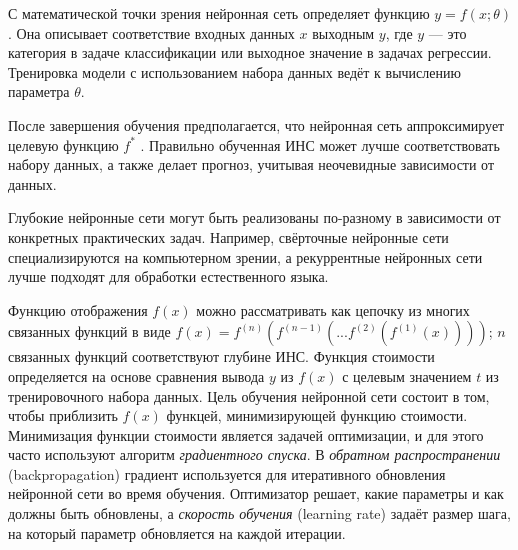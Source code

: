 С математической точки зрения нейронная сеть определяет функцию ${y = f(x; \theta)}$. Она описывает соответствие входных данных ${x}$ выходным ${y}$, где ${y}$ --- это категория в задаче классификации или выходное значение в задачах регрессии. Тренировка модели с использованием набора данных ведёт к вычислению параметра {$\theta$}.

После завершения обучения предполагается, что нейронная сеть аппроксимирует целевую функцию ${f^*}$ \cite{Goodfellow-et-al-2016}. Правильно обученная ИНС может лучше соответствовать набору данных, а также делает прогноз, учитывая неочевидные зависимости от данных.

Глубокие нейронные сети могут быть реализованы по-разному в зависимости от конкретных практических задач. Например, свёрточные нейронные сети специализируются на компьютерном зрении, а рекуррентные нейронных сети лучше подходят для обработки естественного языка.

Функцию отображения ${f(x)}$ можно рассматривать как цепочку из многих связанных функций в виде  ${f(x) = f^{(n)}(f^{(n-1)}(...f^{(2)}(f^{(1)}(x))))}$; ${n}$ связанных функций соответствуют глубине ИНС. Функция стоимости определяется на основе сравнения вывода ${y}$ из ${f(x)}$ с целевым значением ${t}$ из тренировочного набора данных. Цель обучения нейронной сети состоит в том, чтобы приблизить ${f(x)}$ функцей, минимизирующей функцию стоимости. Минимизация функции стоимости является задачей оптимизации, и для этого часто используют алгоритм {\itshape градиентного спуска}. В {\itshape обратном распространении} (backpropagation) градиент используется для итеративного обновления нейронной сети во время обучения. Оптимизатор решает, какие параметры и как должны быть обновлены, а {\itshape скорость обучения} (learning rate) задаёт размер шага, на который параметр обновляется на каждой итерации.
